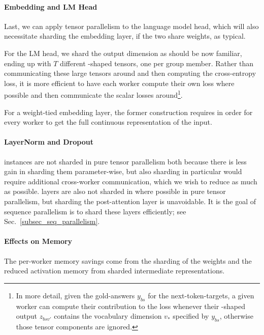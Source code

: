 \documentclass[11pt]{article}
\begin{document}
\paragraph{Embedding and LM Head} Last, we can apply tensor parallelism to the language model head,
which will also necessitate sharding the embedding layer, if the two share weights, as typical.

For the LM head, we shard the output dimension as should be now familiar, ending up with $ T $
different -shaped tensors, one per group member. Rather than communicating
these large tensors around and then computing the cross-entropy loss, it is more efficient to have
each worker compute their own loss where possible and then communicate the scalar losses
around\footnote{In more detail, given the gold-answers $ y _{ bs } $ for the next-token-targets, a
	given worker can compute their contribution to the loss whenever their -shaped
	output $ z _{ bsv' } $ contains the vocabulary dimension $ v _{ * } $ specified by $ y _{ bs } $,
	otherwise those tensor components are ignored.}.

For a weight-tied embedding layer, the former construction requires  in order
for every worker to get the full continuous representation of the input.

\paragraph{LayerNorm and Dropout}  instances are not sharded in pure tensor
parallelism both because there is less gain in sharding them parameter-wise, but also sharding
 in particular would require additional cross-worker communication, which we
wish to reduce as much as possible.  layers are also not sharded in  where
possible in pure tensor parallelism, but sharding the post-attention  layer is
unavoidable. It is the goal of sequence parallelism is to shard these layers efficiently; see
Sec.~\ref{subsec_seq_parallelism}.



\paragraph{Effects on Memory} The per-worker memory savings come from the sharding of the weights
and the reduced activation memory from sharded intermediate representations.
\end{document}
